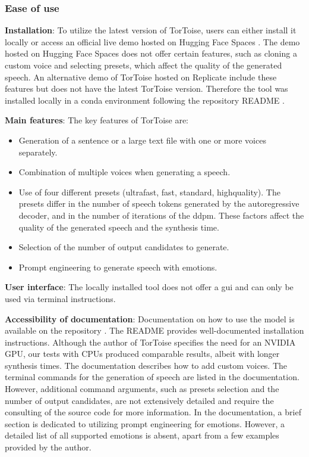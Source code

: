 \subsubsection{Ease of use}

\textbf{Installation}: To utilize the latest version of TorToise, users can either install it locally or access an  official live demo hosted on Hugging Face Spaces \cite{betker_tortoise_hugging_face}. The demo hosted on Hugging Face Spaces does not offer certain features, such as cloning a custom voice and selecting presets, which affect the quality of the generated speech. An alternative demo of TorToise hosted on Replicate \cite{mullis_afiaka87tortoise-tts_nodate} include these features but does not have the latest TorToise version. Therefore the tool was installed locally in a conda environment following the repository README \cite{betker_tortoise_2022}.

\textbf{Main features}: The key features of TorToise are:
\begin{itemize}
    \item Generation of a sentence or a large text file with one or more voices separately.
    \item Combination of multiple voices when generating a speech.
    \item Use of four different presets (ultra\textunderscore fast, fast, standard, high\textunderscore quality). The presets differ in the number of speech tokens generated by the autoregressive decoder, and in the number of iterations of the \gls{ddpm}. These factors affect the quality of the generated speech and the synthesis time.
    \item Selection of the number of output candidates to generate.
    \item Prompt engineering to generate speech with emotions.
\end{itemize}

\textbf{User interface}: The locally installed tool does not offer a \gls{gui} and can only be used via terminal instructions.

\textbf{Accessibility of documentation}: Documentation on how to use the model is available on the repository \cite{betker_tortoise_2022}. The README provides well-documented installation instructions. Although the author of TorToise specifies the need for an NVIDIA GPU, our tests with CPUs produced comparable results, albeit with longer synthesis times. The documentation describes how to add custom voices. The terminal commands for the generation of speech are listed in the documentation. However, additional command arguments, such as presets selection and the number of output candidates, are not extensively detailed and require the consulting of the source code for more information. In the documentation, a brief section is dedicated to utilizing prompt engineering for emotions. However, a detailed list of all supported emotions is absent, apart from a few examples provided by the author.

